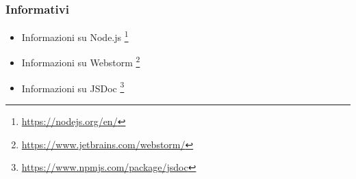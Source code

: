 \subsubsection{Informativi}
	\begin{itemize}
	\item Informazioni su Node.js
	\footnote{\url {https://nodejs.org/en/}}
	\item Informazioni su Webstorm
	\footnote{\url {https://www.jetbrains.com/webstorm/}}
	\item Informazioni su JSDoc
	\footnote{\url {https://www.npmjs.com/package/jsdoc}}
\end{itemize}